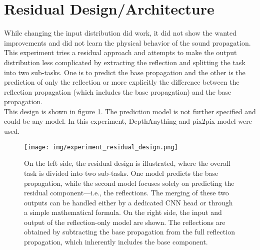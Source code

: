 	\clearpage
		
	\section{Residual Design/Architecture}
	\label{sec:experiments-residual_architecture}
		While changing the input distribution did work, it did not show the wanted improvements and did not learn the physical behavior of the sound propagation. This experiment tries a residual approach and attempts to make the output distribution less complicated by extracting the reflection and splitting the task into two sub-tasks. One is to predict the base propagation and the other is the prediction of only the reflection or more explicitly the difference between the reflection propagation (which includes the base propagation) and the base propagation. \\This design is shown in figure \ref{fig:experiment_residual_design}. 
		The prediction model is not further specified and could be any model. In this experiment, DepthAnything and pix2pix model were used.
		\begin{figure}[H]
			\centering
			\texttt{[image: img/experiment\_residual\_design.png]}
			\caption[On the left side, the residual design is illustrated, where the overall task is divided into two sub-tasks. One model predicts the base propagation, while the second model focuses solely on predicting the residual component—i.e., the reflections. The merging of these two outputs can be handled either by a dedicated CNN head or through a simple mathematical formula. On the right side, the input and output of the reflection-only model are shown. The reflections are obtained by subtracting the base propagation from the full reflection propagation, which inherently includes the base component.]{On the left side, the residual design is illustrated, where the overall task is divided into two sub-tasks. One model predicts the base propagation, while the second model focuses solely on predicting the residual component—i.e., the reflections. The merging of these two outputs can be handled either by a dedicated CNN head or through a simple mathematical formula. On the right side, the input and output of the reflection-only model are shown. The reflections are obtained by subtracting the base propagation from the full reflection propagation, which inherently includes the base component.}
			\label{fig:experiment_residual_design}
		\end{figure}
		\FloatBarrier
